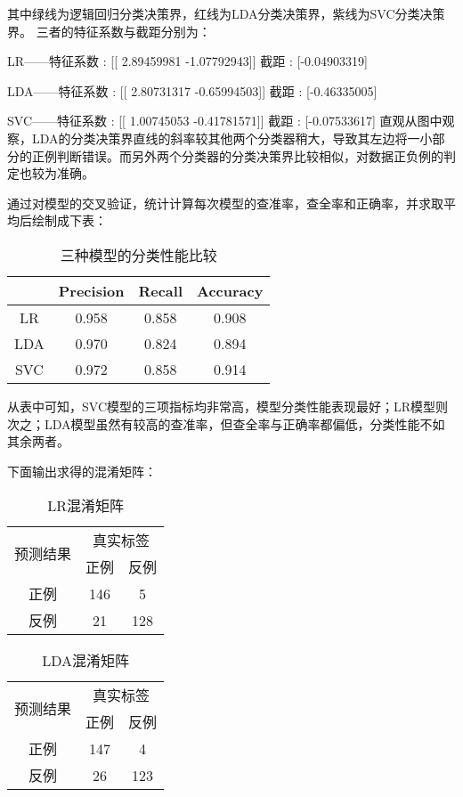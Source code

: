 \documentclass{ctexart}
\begin{document}
其中绿线为逻辑回归分类决策界，红线为LDA分类决策界，紫线为SVC分类决策界。
三者的特征系数与截距分别为：

LR——特征系数 : [[ 2.89459981 -1.07792943]]
截距 : [-0.04903319]

LDA——特征系数 : [[ 2.80731317 -0.65994503]]
截距 : [-0.46335005]

SVC——特征系数 : [[ 1.00745053 -0.41781571]]
截距 : [-0.07533617]
\vfill
直观从图中观察，LDA的分类决策界直线的斜率较其他两个分类器稍大，导致其左边将一小部分的正例判断错误。而另外两个分类器的分类决策界比较相似，对数据正负例的判定也较为准确。
 
通过对模型的交叉验证，统计计算每次模型的查准率，查全率和正确率，并求取平均后绘制成下表：
\begin{table}[h]
	\centering
	\begin{tabular}{c|ccc}
	\toprule
	&Precision&Recall&Accuracy\\
	\midrule
	LR&0.958&0.858&0.908\\
	\midrule
	LDA&0.970&0.824&0.894\\
	\midrule
	SVC&0.972&0.858&0.914\\
	\bottomrule[1.2pt]
	\end{tabular}
	\caption{三种模型的分类性能比较}
\end{table}

从表中可知，SVC模型的三项指标均非常高，模型分类性能表现最好；LR模型则次之；LDA模型虽然有较高的查准率，但查全率与正确率都偏低，分类性能不如其余两者。

下面输出求得的混淆矩阵：
\begin{table}[H]
	\large
	\centering
	\begin{tabular}{c|c|c}
	\hline
	\multirow{2}{*}{预测结果}&\multicolumn{2}{c}{真实标签}\\ \cline{2-3}
	&正例&反例\\
	\hline
	正例&146&5\\
	\hline
	反例&21&128\\
	\hline
	\end{tabular}
	\caption{LR混淆矩阵}
\end{table}

\begin{table}[H]
	\large
	\centering
	\begin{tabular}{c|c|c}
	\hline
	\multirow{2}{*}{预测结果}&\multicolumn{2}{c}{真实标签}\\ \cline{2-3}
	&正例&反例\\
	\hline
	正例&147&4\\
	\hline
	反例&26&123\\
	\hline
	\end{tabular}
	\caption{LDA混淆矩阵}
\end{table}
\end{document}
